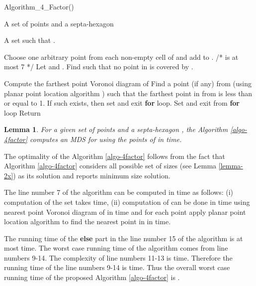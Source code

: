 \documentclass[a4paper,11pt]{article}
\newtheorem{lemma}{Lemma}
\newenvironment{proof}{\noindent {\bf Proof:\,\ }}{\hfill\mbox{\
}\smallskip}
\begin{document}
\begin{algorithm}[!ht]
\caption{Algorithm\_4\_Factor()}
\begin{algorithmic}[1]
 A set  of  points and a septa-hexagon 

 A set  such that . 

\STATE 
\IF{()}
  \STATE Choose one arbitrary point from each non-empty cell of  and add to .
  \STATE  /*  is at most 7 */
  \STATE  Let  and . 
  \FOR{()}
    \IF{()}
	  \STATE Find  such that no point in  is covered by .
         
          \STATE Compute the farthest point Voronoi diagram of  \cite{BCKO08}
          \STATE Find a point  (if any) from  (using planar point location algorithm \cite{PS09}) 
	    such that the farthest point in  from  is less than or equal to 1. If such  exists, then 
	    set  and exit {\bf for} loop.
      \ENDFOR
    \ELSE
	\IF{()}
	  \STATE Set  and exit from {\bf for} loop 
	\ENDIF
      \ENDFOR
    \ENDIF
  \ENDFOR
\ENDIF
\STATE Return 
\end{algorithmic}
\label{algo-4factor}
\end{algorithm}


\begin{lemma} \label{lemma-3x}
For a given set  of  points and a septa-hexagon , the Algorithm \ref{algo-4factor} computes an 
MDS for  using the points of  in  time.
\end{lemma}

\begin{proof}
 The optimality of the Algorithm \ref{algo-4factor} follows from the fact that Algorithm \ref{algo-4factor} 
 considers all possible set of sizes  (see Lemma \ref{lemma-2x}) as its solution and 
 reports minimum size solution.
 
 The line number 7 of the algorithm can be computed in  time as follows: (i) computation of the set 
  takes  time, (ii) computation of  can be done in  time using nearest 
 point Voronoi diagram of  in  time and for each point  apply planar point 
 location algorithm to find the nearest point in  in  time.
 
 The running time of the {\bf else} part in the line number 15 of the algorithm is at most  time. 
 The worst case running time of the algorithm comes from line numbers 9-14. The complexity of line numbers 11-13 
 is  time. Therefore the running time of the line numbers 9-14 is  time. 
 Thus the overall worst case running time of the proposed Algorithm \ref{algo-4factor} is .
\end{proof}
\end{document}
